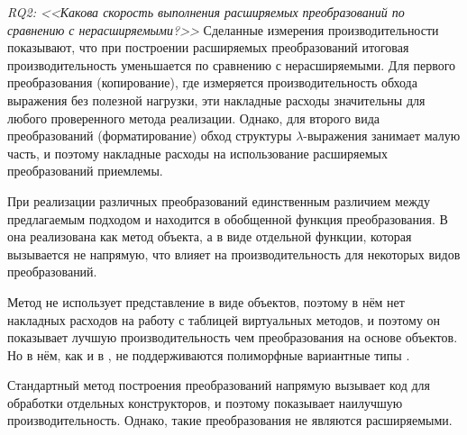 \emph{RQ2: <<Какова скорость выполнения расширяемых преобразований по сравнению с нерасширяемыми?>>} Сделанные измерения производительности показывают, что при построении расширяемых преобразований итоговая производительность уменьшается по сравнению с нерасширяемыми. Для первого  преобразования (копирование), где измеряется производительность обхода выражения без полезной нагрузки, эти накладные расходы значительны для любого проверенного метода реализации. Однако, для второго вида преобразований (форматирование) обход структуры $\lambda$-выражения занимает малую часть, и поэтому накладные расходы на использование расширяемых преобразований приемлемы. 

При реализации различных преобразований единственным различием между предлагаемым подходом и \Visitors{} находится в обобщенной функция преобразования. В \Visitors{} она реализована как метод объекта, а в \GT{}  виде отдельной функции, которая вызывается не напрямую, что влияет на производительность для некоторых видов преобразований.

Метод  не использует представление в виде объектов, поэтому в нём нет накладных расходов на работу с таблицей виртуальных методов, и поэтому он показывает лучшую производительность чем преобразования на основе объектов. Но в нём, как и в \Visitors{}, не поддерживаются полиморфные вариантные типы \OCaml{}.

Стандартный метод построения преобразований напрямую вызывает код для обработки отдельных конструкторов, и поэтому показывает наилучшую производительность. Однако, такие преобразования не являются расширяемыми.




